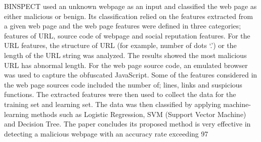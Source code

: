 BINSPECT used an unknown webpage as an input and classified the web page as either malicious or benign. Its classification relied on the features extracted from a given web page and the web page features were defined in three categories; features of URL, source code of webpage and social reputation features. 
For the URL features, the structure of URL (for example, number of dots ‘.’) or the length of the URL string was analyzed. The results showed the most malicious URL has abnormal length. For the web page source code, an emulated browser was used to capture the obfuscated JavaScript. Some of the features considered in the web page sources code included the number of; lines, links and suspicious functions. The extracted features were then used to collect the data for the training set and learning set. The data was then classified by applying machine-learning methods such as Logistic Regression, SVM (Support Vector Machine) and Decision Tree.
The paper concludes its proposed method is very effective in detecting a malicious webpage with an accuracy rate exceeding 97%

